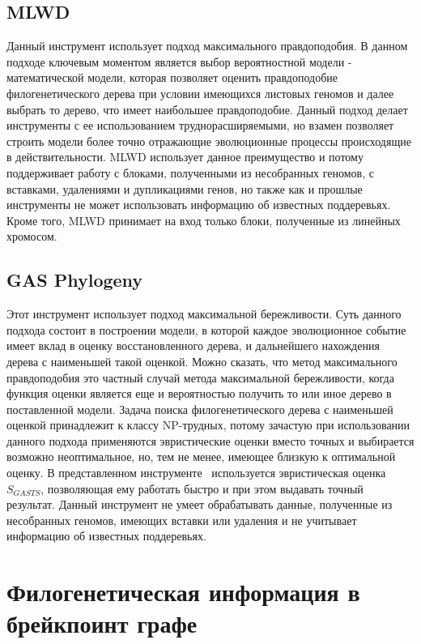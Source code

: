 \subsection{MLWD~\cite{hu2014mlgo}}
Данный инструмент использует подход максимального правдоподобия.
В данном подходе ключевым моментом является выбор вероятностной модели - математической модели,
которая позволяет оценить правдоподобие филогенетического дерева при условии имеющихся листовых геномов
и далее выбрать то дерево, что имеет наибольшее правдоподобие.
Данный подход делает инструменты с ее использованием труднорасширяемыми,
но взамен позволяет строить модели более точно отражающие эволюционные процессы происходящие в действительности.
MLWD использует данное преимущество и потому поддерживает работу с блоками, полученными из несобранных геномов,
с вставками, удалениями и дупликациями генов, но также как
и прошлые инструменты не может использовать информацию об известных поддеревьях.
Кроме того, MLWD принимает на вход только блоки, полученные из линейных хромосом.

\subsection{GAS Phylogeny}
Этот инструмент использует подход максимальной бережливости.
Суть данного подхода состоит в построении модели,
в которой каждое эволюционное событие имеет вклад в оценку восстановленного дерева, и дальнейшего нахождения дерева с наименьшей такой оценкой.
Можно сказать, что метод максимального правдоподобия это частный случай метода максимальной бережливости, когда функция оценки является
еще и вероятностью получить то или иное дерево в поставленной модели.
Задача поиска филогенетического дерева с наименьшей оценкой принадлежит к классу NP-трудных, потому зачастую при использовании данного подхода
применяются эвристические оценки вместо точных и выбирается возможно неоптимальное, но, тем не менее, имеющее близкую к оптимальной оценку.
В представленном инструменте~\cite{xu2011gasts} используется эвристическая оценка $S_{GASTS}$, позволяющая ему работать быстро и при этом выдавать точный результат.
Данный инструмент не умеет обрабатывать данные, полученные из несобранных геномов, имеющих вставки или удаления и не учитывает информацию об
известных поддеревьях.

\section{Филогенетическая информация в брейкпоинт графе}

